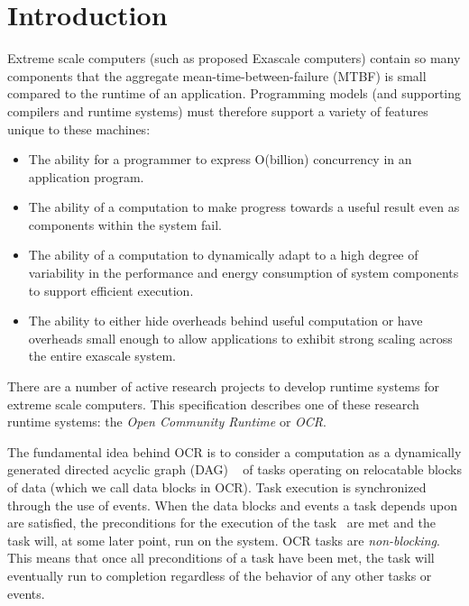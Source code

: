 %
\chapter{Introduction}
\label{chap:introduction}
Extreme scale computers (such as proposed Exascale computers) contain
so many components that the aggregate mean-time-between-failure (MTBF)
is small
compared to the runtime of an application. Programming models (and
supporting compilers and runtime systems) must therefore support a
variety of features unique to these machines:
\begin{itemize}
\item The ability for a programmer to
express O(billion) concurrency in an application program.

\item The ability of a computation to make progress towards a useful
result even as components within the system fail.

\item The ability of a computation to dynamically adapt to a high
degree of variability in the performance and energy consumption of
system components to support efficient execution.

\item The ability to either hide overheads behind useful computation
or have overheads small enough to allow applications to exhibit strong
scaling across the entire exascale system.

\end{itemize}

There are a number of active research projects to develop runtime systems
for extreme scale computers. This specification describes one of
these research runtime systems: the \emph{Open Community Runtime} or \emph{OCR}.

The fundamental idea behind OCR is to consider a computation as a
dynamically generated directed acyclic graph (DAG) ~\cite{
TaSa11,Tasirlar11,Zuckerman:2011:UCP:2000417.2000424} of tasks
operating on relocatable blocks of data (which we call data blocks in
OCR). Task execution is synchronized through the use of events.
When the data blocks and events a task depends upon are satisfied, the
preconditions for the execution of the task~\cite{SSWS13} are met and the
task will, at some later point, run on the system. OCR tasks are
\emph{non-blocking}. This means that once all
preconditions of a task have been met, the task will eventually run to completion
regardless of the behavior of any other tasks or events.


